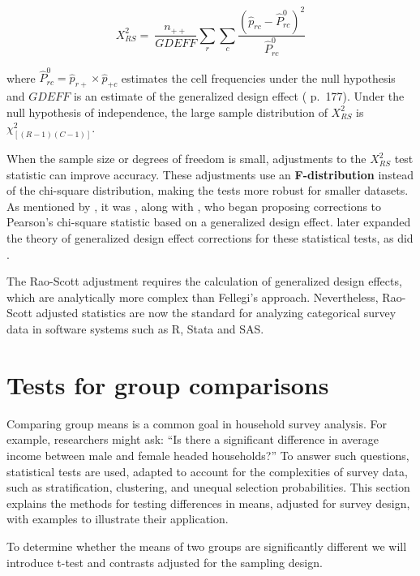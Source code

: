 \documentclass[
  12pt,
]{book}
\begin{document}
\[
X_{RS}^2 =\ \frac {n_{++}} {GDEFF} \sum_r \sum_c \frac{\left(\widehat{p}_{rc} - \widehat P_{rc}^0 \right)^2}{\widehat P_{rc}^0}
\]

where \(\widehat P_{rc}^0 = \widehat p_{r+} \times \widehat p_{+c}\) estimates the cell frequencies under the null hypothesis and \(GDEFF\) is an estimate of the generalized design effect (\citet{Heeringa2017} p.~177). Under the null hypothesis of independence, the large sample distribution of \(X_{RS}^2\) is \(\chi^2_{[(R-1) (C-1)]}\).

When the sample size or degrees of freedom is small, adjustments to the \(X_{RS}^2\) test statistic can improve accuracy. These adjustments use an \textbf{F-distribution} instead of the chi-square distribution, making the tests more robust for smaller datasets. As mentioned by \citet{Heeringa2017}, it was \citet{Fay1979}, along with \citet{Fellegi1980}, who began proposing corrections to Pearson's chi-square statistic based on a generalized design effect. \citet{Rao1984} later expanded the theory of generalized design effect corrections for these statistical tests, as did \citet{thomas1987small_sample}.

The Rao-Scott adjustment requires the calculation of generalized design effects, which are analytically more complex than Fellegi's approach. Nevertheless, Rao-Scott adjusted statistics are now the standard for analyzing categorical survey data in software systems such as R, Stata and SAS.

\hypertarget{tests-for-group-comparisons}{%
\section{Tests for group comparisons}\label{tests-for-group-comparisons}}

Comparing group means is a common goal in household survey analysis. For example, researchers might ask: ``Is there a significant difference in average income between male and female headed households?'' To answer such questions, statistical tests are used, adapted to account for the complexities of survey data, such as stratification, clustering, and unequal selection probabilities. This section explains the methods for testing differences in means, adjusted for survey design, with examples to illustrate their application.

To determine whether the means of two groups are significantly different we will introduce t-test and contrasts adjusted for the sampling design.
\end{document}
